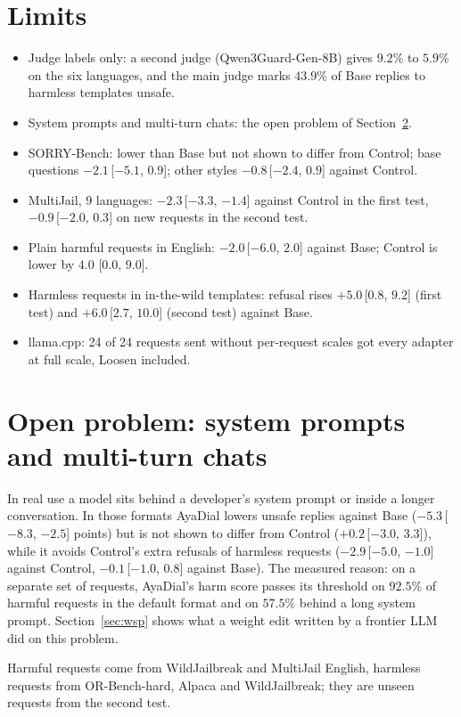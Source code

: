 \documentclass[10pt,a4paper]{article}
\begin{document}
\section{Limits}
\begin{itemize}\setlength{\itemsep}{1pt}
\item Judge labels only: a second judge (Qwen3Guard-Gen-8B) gives $9.2$\% to $5.9$\% on the six languages, and the main judge marks $43.9$\% of Base replies to harmless templates unsafe.
\item System prompts and multi-turn chats: the open problem of Section~\ref{sec:open}.
\item SORRY-Bench: lower than Base but not shown to differ from Control; base questions $-2.1$\,[$-5.1$, $0.9$]; other styles $-0.8$\,[$-2.4$, $0.9$] against Control.
\item MultiJail, 9 languages: $-2.3$\,[$-3.3$, $-1.4$] against Control in the first test, $-0.9$\,[$-2.0$, $0.3$] on new requests in the second test.
\item Plain harmful requests in English: $-2.0$\,[$-6.0$, $2.0$] against Base; Control is lower by $4.0$ [$0.0$, $9.0$].
\item Harmless requests in in-the-wild templates: refusal rises $+5.0$\,[$0.8$, $9.2$] (first test) and $+6.0$\,[$2.7$, $10.0$] (second test) against Base.
\item llama.cpp: 24 of 24 requests sent without per-request scales got every adapter at full scale, Loosen included.
\end{itemize}
\section{Open problem: system prompts and multi-turn chats}\label{sec:open}
In real use a model sits behind a developer's system prompt or inside a longer conversation. In those formats AyaDial lowers unsafe replies against Base ($-5.3$\,[$-8.3$, $-2.5$] points) but is not shown to differ from Control ($+0.2$\,[$-3.0$, $3.3$]), while it avoids Control's extra refusals of harmless requests ($-2.9$\,[$-5.0$, $-1.0$] against Control, $-0.1$\,[$-1.0$, $0.8$] against Base). The measured reason: on a separate set of requests, AyaDial's harm score passes its threshold on $92.5$\% of harmful requests in the default format and on $57.5$\% behind a long system prompt. Section~\ref{sec:wsp} shows what a weight edit written by a frontier LLM did on this problem.

Harmful requests come from WildJailbreak and MultiJail English, harmless requests from OR-Bench-hard, Alpaca and WildJailbreak; they are unseen requests from the second test.
\end{document}
